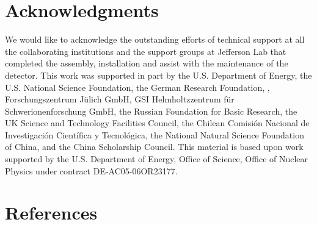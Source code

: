 \documentclass{elsarticle}
\begin{document}

\tableofcontents




% 







  




   


\section{Acknowledgments}  
We would like to acknowledge the outstanding efforts of technical support at all the collaborating institutions and the support groups at Jefferson Lab that completed the assembly, installation
and assist with the maintenance of the detector.  This work was supported in part by the U.S. Department of Energy, the U.S. National Science Foundation, the German Research Foundation, , Forschungszentrum J\"ulich GmbH, GSI Helmholtzzentrum f\"{u}r Schwerionenforschung GmbH, the Russian Foundation for Basic Research, the UK Science and Technology Facilities Council, the Chilean Comisi\'{o}n Nacional de Investigaci\'{o}n Cient\'{i}fica y Tecnol\'{o}gica, the National Natural Science Foundation of China, and the China Scholarship Council. This material is based upon work supported by the U.S. Department of Energy, Office of Science, Office of Nuclear Physics under contract DE-AC05-06OR23177. 

\newpage

\section*{References}
   

%
%

\end{document}
